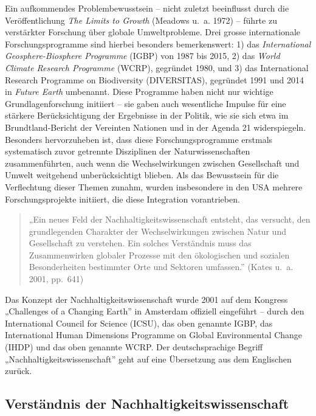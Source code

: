 \documentclass[
  nswissgerman,
  a4paper,
  openany]{book}
\begin{document}
Ein aufkommendes Problembewusstsein -- nicht zuletzt beeinflusst durch
die Veröffentlichung \emph{The Limits to Growth} (Meadows u.~a. 1972) --
führte zu verstärkter Forschung über globale Umweltprobleme. Drei grosse
internationale Forschungsprogramme sind hierbei besonders bemerkenswert:
1) das \emph{International Geosphere-Biosphere Programme} (IGBP) von
1987 bis 2015, 2) das \emph{World Climate Research Programme} (WCRP),
gegründet 1980, und 3) das International Research Programme on
Biodiversity (DIVERSITAS), gegründet 1991 und 2014 in \emph{Future
Earth} umbenannt. Diese Programme haben nicht nur wichtige
Grundlagenforschung initiiert -- sie gaben auch wesentliche Impulse für
eine stärkere Berücksichtigung der Ergebnisse in der Politik, wie sie
sich etwa im Brundtland-Bericht der Vereinten Nationen und in der Agenda
21 widerspiegeln. Besonders hervorzuheben ist, dass diese
Forschungsprogramme erstmals systematisch zuvor getrennte Disziplinen
der Naturwissenschaften zusammenführten, auch wenn die Wechselwirkungen
zwischen Gesellschaft und Umwelt weitgehend unberücksichtigt blieben.
Als das Bewusstsein für die Verflechtung dieser Themen zunahm, wurden
insbesondere in den USA mehrere Forschungsprojekte initiiert, die diese
Integration vorantrieben.

\begin{quote}
„Ein neues Feld der Nachhaltigkeitswissenschaft entsteht, das versucht,
den grundlegenden Charakter der Wechselwirkungen zwischen Natur und
Gesellschaft zu verstehen. Ein solches Verständnis muss das
Zusammenwirken globaler Prozesse mit den ökologischen und sozialen
Besonderheiten bestimmter Orte und Sektoren umfassen.'' (Kates u.~a.
2001, pp.~641)
\end{quote}

Das Konzept der Nachhaltigkeitswissenschaft wurde 2001 auf dem Kongress
„Challenges of a Changing Earth'' in Amsterdam offiziell eingeführt --
durch den International Council for Science (ICSU), das oben genannte
IGBP, das International Human Dimensions Programme on Global
Environmental Change (IHDP) und das oben genannte WCRP. Der
deutschsprachige Begriff „Nachhaltigkeitswissenschaft'' geht auf eine
Übersetzung aus dem Englischen zurück.

\subsection{Verständnis der
Nachhaltigkeitswissenschaft}\label{verstuxe4ndnis-der-nachhaltigkeitswissenschaft}
\end{document}
